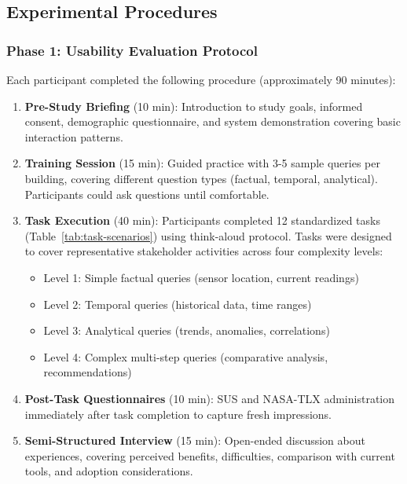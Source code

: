 \documentclass[acmlarge]{acmart}
\begin{document}
\subsection{Experimental Procedures}

\subsubsection{Phase 1: Usability Evaluation Protocol}

Each participant completed the following procedure (approximately 90 minutes):

\begin{enumerate}
    \item \textbf{Pre-Study Briefing} (10 min): Introduction to study goals, informed consent, demographic questionnaire, and system demonstration covering basic interaction patterns.
    
    \item \textbf{Training Session} (15 min): Guided practice with 3-5 sample queries per building, covering different question types (factual, temporal, analytical). Participants could ask questions until comfortable.
    
    \item \textbf{Task Execution} (40 min): Participants completed 12 standardized tasks (Table~\ref{tab:task-scenarios}) using think-aloud protocol. Tasks were designed to cover representative stakeholder activities across four complexity levels:
    \begin{itemize}
        \item Level 1: Simple factual queries (sensor location, current readings)
        \item Level 2: Temporal queries (historical data, time ranges)
        \item Level 3: Analytical queries (trends, anomalies, correlations)
        \item Level 4: Complex multi-step queries (comparative analysis, recommendations)
    \end{itemize}
    
    \item \textbf{Post-Task Questionnaires} (10 min): SUS and NASA-TLX administration immediately after task completion to capture fresh impressions.
    
    \item \textbf{Semi-Structured Interview} (15 min): Open-ended discussion about experiences, covering perceived benefits, difficulties, comparison with current tools, and adoption considerations.
\end{enumerate}
\end{document}
